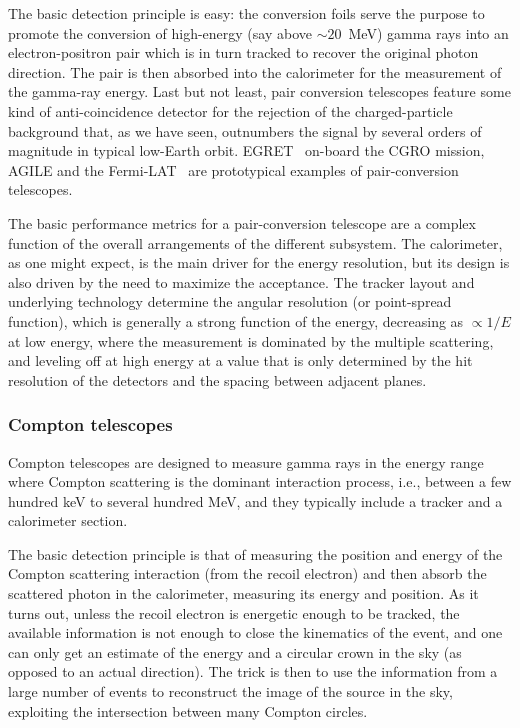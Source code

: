 The basic detection principle is easy: the conversion foils serve the purpose
to promote the conversion of high-energy (say above $\sim 20$~MeV) gamma rays
into an electron-positron pair which is in turn tracked to recover the original
photon direction.
The pair is then absorbed into the calorimeter for the measurement of the
gamma-ray energy. Last but not least, pair conversion telescopes feature some
kind of anti-coincidence detector for the rejection of the charged-particle
background that, as we have seen, outnumbers the signal by several orders of
magnitude in typical low-Earth orbit. EGRET~\cite{1988SSRv...49...69K} on-board
the CGRO mission, AGILE and the Fermi-LAT~\cite{2009ApJ...697.1071A} are
prototypical examples of pair-conversion telescopes.

The basic performance metrics for a pair-conversion telescope are a complex function
of the overall arrangements of the different subsystem. The calorimeter, as one
might expect, is the main driver for the energy resolution, but its design is
also driven by the need to maximize the acceptance. The tracker layout and
underlying technology determine the angular resolution (or point-spread function),
which is generally a strong function of the energy, decreasing as $\propto 1/E$
at low energy, where the measurement is dominated by the multiple scattering, and
leveling off at high energy at a value that is only determined by the hit resolution
of the detectors and the spacing between adjacent planes.


\subsubsection{Compton telescopes}

Compton telescopes are designed to measure gamma rays in the energy range where
Compton scattering is the dominant interaction process, i.e., between a few
hundred keV to several hundred MeV, and they typically include a tracker and a
calorimeter section.

The basic detection principle is that of measuring the position and energy of
the Compton scattering interaction (from the recoil electron) and then absorb
the scattered photon in the calorimeter, measuring its energy and position.
As it turns out, unless the recoil electron is energetic enough to be tracked,
the available information is not enough to close the kinematics of the event,
and one can only get an estimate of the energy and a circular crown in the
sky (as opposed to an actual direction). The trick is then to use the information
from a large number of events to reconstruct the image of the source in the sky,
exploiting the intersection between many Compton circles.


